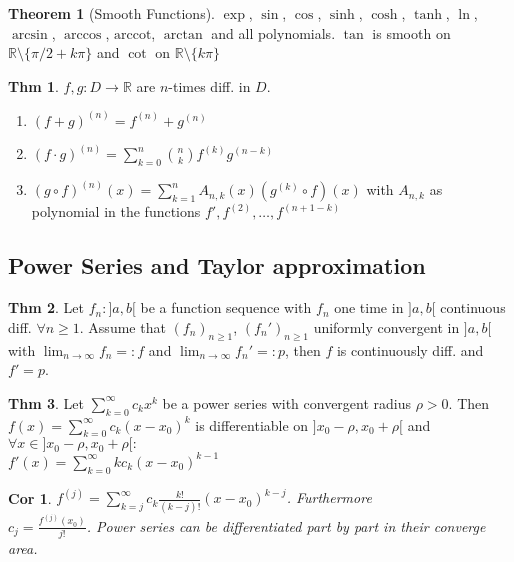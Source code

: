\documentclass[a4paper, 10pt]{article}
\newtheorem*{corollary}{Cor}
\theoremstyle{definition}
\newtheorem*{theorem}{Thm}
\theoremstyle{ex}
\theoremstyle{named}
\newtheorem*{ntheorem_wrapper}{Theorem}
\newenvironment{ntheorem}%
    {\begin{mdframed}[style=important]\begin{ntheorem_wrapper}}%
    {\end{ntheorem_wrapper}\end{mdframed}}
\newcommand{\R}{\mathbb{R}}
\begin{document}
\begin{ntheorem}[Smooth Functions]
    $\exp$, $\sin$, $\cos$, $\sinh$, $\cosh$, $\tanh$, $\ln$, $\arcsin$, $\arccos$, $\text{arccot}$, $\arctan$ and all polynomials. $\tan$ is smooth on $\R \setminus \{\pi / 2 + k \pi\}$ and $\cot$ on $\R \setminus\{k\pi\}$
\end{ntheorem}

\begin{theorem}
    $f, g: D \to \R$ are $n$-times diff. in $D$.
    \begin{enumerate}
        \item $(f + g)^{(n)} = f^{(n)} + g^{(n)}$
        \item $(f \cdot g)^{(n)} = \sum_{k = 0}^n \binom{n}{k}f^{(k)}g^{(n-k)}$
        \item $(g \circ f)^{(n)}(x) = \sum_{k=1}^n A_{n,k}(x)(g^{(k)} \circ f)(x)$ with $A_{n,k}$ as polynomial in the functions $f', f^{(2)}, \ldots, f^{(n+1-k)}$
    \end{enumerate}
\end{theorem}

\subsection{Power Series and Taylor approximation}
\begin{theorem}
    Let $f_n : ]a, b[$ be a function sequence with $f_n$ one time in $]a, b[$ continuous diff. $\forall n \geq 1$. Assume that $(f_n)_{n \geq 1}$, $(f_n')_{n \geq 1}$ uniformly convergent in $]a, b[$ with $\lim_{n \to \infty} f_n =: f$ and $\lim_{n \to \infty} f_n' =: p$, then $f$ is continuously diff. and $f' = p$.
\end{theorem}

\begin{theorem}
    Let $\sum_{k = 0}^\infty c_k x^k$ be a power series with convergent radius $\rho > 0$. Then $f(x) = \sum_{k = 0}^\infty c_k(x - x_0)^k$ is differentiable on $]x_0 - \rho , x_0 + \rho[$ and $\forall x \in ]x_0 - \rho , x_0 + \rho[:$ \\
    $f'(x) = \sum_{k = 0}^\infty kc_k(x - x_0)^{k - 1}$
\end{theorem}

\begin{corollary}
    $f^{(j)} = \sum_{k = j}^\infty c_k \frac{k!}{(k-j)!}(x - x_0)^{k - j}$. Furthermore \\ $c_j = \frac{f^{(j)}(x_0)}{j!}$. Power series can be differentiated part by part in their converge area.
\end{corollary}
\end{document}
